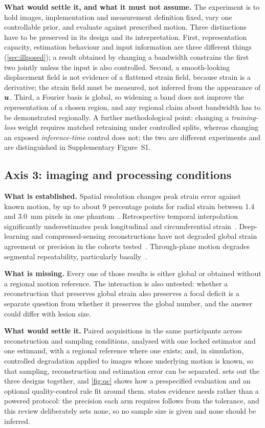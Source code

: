 \textbf{What would settle it, and what it must not assume.} The experiment is to hold images,
implementation and measurement definition fixed, vary one controllable prior, and evaluate against
prescribed motion. Three distinctions have to be preserved in its design and its interpretation.
First, representation capacity, estimation behaviour and input information are three different
things (\cref{sec:illposed}); a result obtained by changing a bandwidth constrains the first two
jointly unless the input is also controlled. Second, a smooth-looking displacement field is not
evidence of a flattened strain field, because strain is a derivative; the strain field must be
measured, not inferred from the appearance of $\bm{u}$. Third, a Fourier basis is global, so
widening a band does not improve the representation of a chosen region, and any regional claim about
bandwidth has to be demonstrated regionally. A further methodological point: changing a
\emph{training-loss} weight requires matched retraining under controlled splits, whereas changing an
exposed \emph{inference-time} control does not; the two are different experiments and are
distinguished in Supplementary Figure~S1.

\subsection{Axis 3: imaging and processing conditions}\label{sec:axis_conditions}

\textbf{What is established.} Spatial resolution changes peak strain error against known motion, by
up to about 9 percentage points for radial strain between 1.4 and 3.0~mm pixels in one
phantom~\citep{adams2023}. Retrospective temporal interpolation significantly underestimates peak
longitudinal and circumferential strain~\citep{grob2025}. Deep-learning and compressed-sensing
reconstructions have not degraded global strain agreement or precision in the cohorts
tested~\citep{vornehm2025cinevn,yoon2023regain,tsuneta2025dlr}. Through-plane motion degrades
segmental repeatability, particularly basally~\citep{bell2025strain8}.

\textbf{What is missing.} Every one of those results is either global or obtained without a regional
motion reference. The interaction is also untested: whether a reconstruction that preserves global
strain also preserves a focal deficit is a separate question from whether it preserves the global
number, and the answer could differ with lesion size.

\textbf{What would settle it.} Paired acquisitions in the same participants across reconstruction
and sampling conditions, analysed with one locked estimator and one estimand, with a regional
reference where one exists; and, in simulation, controlled degradation applied to images whose
underlying motion is known, so that sampling, reconstruction and estimation error can be separated.
 sets out the three designs together, and \cref{fig:qc} shows how a prespecified
evaluation and an optional quality-control rule fit around them.  states evidence
needs rather than a powered protocol: the precision each arm requires follows from the tolerance,
and this review deliberately sets none, so no sample size is given and none should be inferred.


